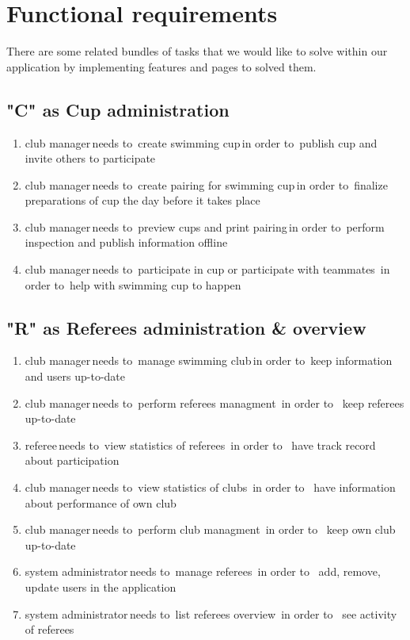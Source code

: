 \section{Functional requirements}
There are some related bundles of tasks that we would like to solve within our application by implementing features and pages to solved them.
\subsection*{"C" as Cup administration}
\begin{enumerate}
    \item \lbrack club manager\rbrack \,needs to\, \lbrack create swimming cup\rbrack \,in order to\, \lbrack publish cup and invite others to participate\rbrack
    \item \lbrack club manager\rbrack \,needs to\, \lbrack create pairing for swimming cup\rbrack \,in order to\, \lbrack finalize preparations of cup the day before it takes place\rbrack
    \item \lbrack club manager\rbrack \,needs to\, \lbrack preview cups and print pairing\rbrack \,in order to\, \lbrack perform inspection and publish information offline\rbrack
    \item \lbrack club manager\rbrack \,needs to\, \lbrack participate in cup or participate with teammates\rbrack \, in order to\, \lbrack help with swimming cup to happen\rbrack
\end{enumerate} 
\subsection*{"R" as Referees administration \& overview}
\begin{enumerate}
\item \lbrack club manager\rbrack \,needs to\, \lbrack manage swimming club\rbrack \,in order to\, \lbrack keep information and users up-to-date\rbrack
\item \lbrack club manager\rbrack \,needs to\, \lbrack perform referees managment\rbrack \, in order to \, \lbrack keep referees up-to-date\rbrack
\item \lbrack referee\rbrack \,needs to\, \lbrack view statistics of referees\rbrack \, in order to \, \lbrack have track record about participation\rbrack
\item \lbrack club manager\rbrack \,needs to\, \lbrack view statistics of clubs\rbrack \, in order to \, \lbrack have information about performance of own club\rbrack
\item \lbrack club manager\rbrack \,needs to\, \lbrack perform club managment\rbrack \, in order to \, \lbrack keep own club up-to-date\rbrack
\item \lbrack system administrator\rbrack \,needs to\, \lbrack manage referees\rbrack \, in order to \, \lbrack add, remove, update users in the application\rbrack
\item \lbrack system administrator\rbrack \,needs to\, \lbrack list referees overview\rbrack \, in order to \, \lbrack see activity of referees\rbrack
\end{enumerate} 
